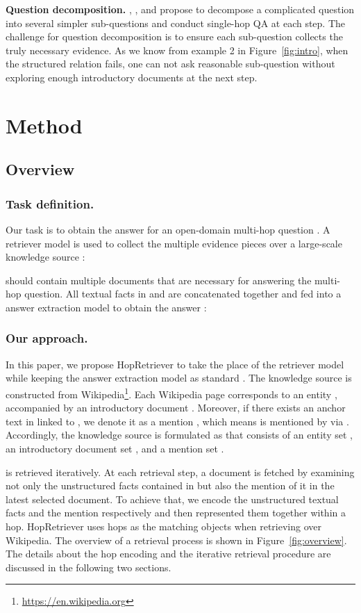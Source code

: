 \documentclass[letterpaper]{article} \usepackage{aaai21}  \usepackage{times}  \usepackage{helvet} \usepackage{courier}  \usepackage[hyphens]{url}  \usepackage{graphicx} \urlstyle{rm} \def\UrlFont{\rm}  \usepackage{graphicx}  \usepackage{natbib}  \usepackage{caption} \frenchspacing  \setlength{\pdfpagewidth}{8.5in}  \setlength{\pdfpageheight}{11in}
\begin{document}
\noindent
\textbf{Question decomposition.}
\citet{QDMR}, \citet{Unsupervised-QD}, and \citet{DecompRC} propose to decompose a complicated question into several simpler sub-questions and conduct single-hop QA at each step. The challenge for question decomposition is to ensure each sub-question collects the truly necessary evidence. As we know from example 2 in Figure~\ref{fig:intro}, when the structured relation fails, one can not ask reasonable sub-question without exploring enough introductory documents at the next step.








\section{Method}
\subsection{Overview}
\subsubsection{Task definition.}
Our task is to obtain the answer  for an open-domain multi-hop question . A retriever model  is used to collect the multiple evidence pieces over a large-scale knowledge source :

 should contain multiple documents that are necessary for answering the multi-hop question. All textual facts in  and  are concatenated together and fed into a answer extraction model  to obtain the answer :


\subsubsection{Our approach.}
In this paper, we propose HopRetriever to take the place of the retriever model  while keeping the answer extraction model  as standard \cite{BERT}. The knowledge source  is constructed from Wikipedia\footnote{\url{https://en.wikipedia.org}}. Each Wikipedia page corresponds to an entity , accompanied by an introductory document . Moreover, if there exists an anchor text in  linked to , we denote it as a mention , which means  is mentioned by  via . Accordingly, the knowledge source is formulated as  that consists of an entity set , an introductory document set , and a mention set . 

 is retrieved iteratively. At each retrieval step, a document is fetched by examining not only the unstructured facts contained in but also the mention of it in the latest selected document. To achieve that, we encode the unstructured textual facts and the mention respectively and then represented them together within a hop. HopRetriever uses hops as the matching objects when retrieving over Wikipedia. The overview of a retrieval process is shown in Figure~\ref{fig:overview}. The details about the hop encoding and the iterative retrieval procedure are discussed in the following two sections. 
\end{document}
